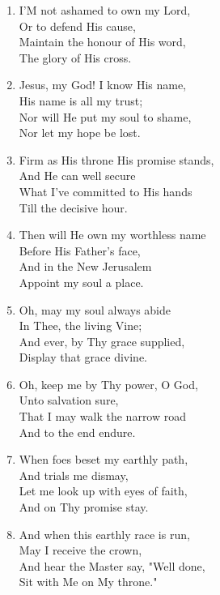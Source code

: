 \documentclass[11pt,a4paper]{article}
\begin{document}
\begin{enumerate}
    \item I'M not ashamed to own my Lord, \\
        Or to defend His cause, \\
        Maintain the honour of His word, \\
        The glory of His cross.

    \item Jesus, my God! I know His name, \\
        His name is all my trust; \\
        Nor will He put my soul to shame, \\
        Nor let my hope be lost.

    \item Firm as His throne His promise stands, \\
        And He can well secure \\
        What I've committed to His hands \\
        Till the decisive hour.

    \item Then will He own my worthless name \\
        Before His Father's face, \\
        And in the New Jerusalem \\
        Appoint my soul a place.

    \item Oh, may my soul always abide \\
        In Thee, the living Vine; \\
        And ever, by Thy grace supplied, \\
        Display that grace divine.

    \item Oh, keep me by Thy power, O God, \\
        Unto salvation sure, \\
        That I may walk the narrow road \\
        And to the end endure.

    \item When foes beset my earthly path, \\
        And trials me dismay, \\
        Let me look up with eyes of faith, \\
        And on Thy promise stay.

    \item And when this earthly race is run, \\
        May I receive the crown, \\
        And hear the Master say, "Well done, \\
        Sit with Me on My throne."

\end{enumerate}
\end{document}
